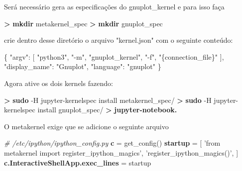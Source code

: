 \documentclass[11pt]{article}
\newenvironment{Shaded}{}{}
\newcommand{\KeywordTok}[1]{\textcolor[rgb]{0.00,0.44,0.13}{\textbf{{#1}}}}
\newcommand{\DataTypeTok}[1]{\textcolor[rgb]{0.56,0.13,0.00}{{#1}}}
\newcommand{\StringTok}[1]{\textcolor[rgb]{0.25,0.44,0.63}{{#1}}}
\newcommand{\CommentTok}[1]{\textcolor[rgb]{0.38,0.63,0.69}{\textit{{#1}}}}
\newcommand{\OtherTok}[1]{\textcolor[rgb]{0.00,0.44,0.13}{{#1}}}
\newcommand{\FunctionTok}[1]{\textcolor[rgb]{0.02,0.16,0.49}{{#1}}}
\newcommand{\NormalTok}[1]{{#1}}
\begin{document}
Será necessário gera as especificações do gnuplot\_kernel e para isso
faça

\begin{Shaded}
\begin{Highlighting}[]
\KeywordTok{>} \KeywordTok{mkdir} \NormalTok{metakernel_spec}
\KeywordTok{>} \KeywordTok{mkdir} \NormalTok{gnuplot_spec}
\end{Highlighting}
\end{Shaded}

crie dentro desse diretório o arquivo "kernel.json" com o seguinte
conteúdo:

\begin{Shaded}
\begin{Highlighting}[]
\FunctionTok{\{}
  \DataTypeTok{"argv"}\FunctionTok{:} \OtherTok{[}
    \StringTok{"python3"}\OtherTok{,}
    \StringTok{"-m"}\OtherTok{,}
    \StringTok{"gnuplot_kernel"}\OtherTok{,}
    \StringTok{"-f"}\OtherTok{,}
    \StringTok{"\{connection_file\}"}
  \OtherTok{]}\FunctionTok{,}
  \DataTypeTok{"display_name"}\FunctionTok{:} \StringTok{"Gnuplot"}\FunctionTok{,}
  \DataTypeTok{"language"}\FunctionTok{:} \StringTok{"gnuplot"}
\FunctionTok{\}}
\end{Highlighting}
\end{Shaded}

Agora ative os dois kernels fazendo:

\begin{Shaded}
\begin{Highlighting}[]
\KeywordTok{>} \KeywordTok{sudo} \NormalTok{-H jupyter-kernelspec install metakernel_spec/}
\KeywordTok{>} \KeywordTok{sudo} \NormalTok{-H jupyter-kernelspec install gnuplot_spec/}
\KeywordTok{>} \KeywordTok{jupyter-notebook.} 
\end{Highlighting}
\end{Shaded}

O metakernel exige que se adicione o seguinte arquivo

\begin{Shaded}
\begin{Highlighting}[]
\CommentTok{# /etc/ipython/ipython_config.py}
\KeywordTok{c} \NormalTok{= get_config()}
\KeywordTok{startup} \NormalTok{= [}
   \StringTok{'from metakernel import register_ipython_magics'}\NormalTok{,}
   \StringTok{'register_ipython_magics()'}\NormalTok{,}
\NormalTok{]}
\KeywordTok{c.InteractiveShellApp.exec_lines} \NormalTok{= startup}
\end{Highlighting}
\end{Shaded}
\end{document}
